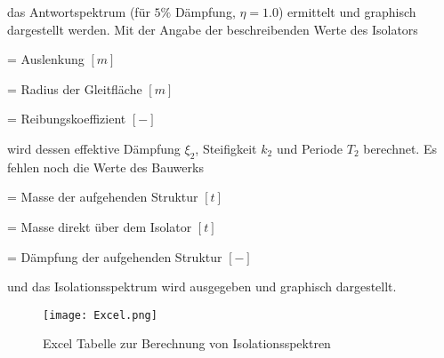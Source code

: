 \pagebreak

das Antwortspektrum (für $5\%$ Dämpfung, $\eta = 1.0$) ermittelt und graphisch dargestellt werden.
Mit der Angabe der beschreibenden Werte des Isolators

    = Auslenkung $[m]$ \par
{}    = Radius der Gleitfläche $[m]$ \par
\makebox[1cm]{$\mu$}  = Reibungskoeffizient $[-]$ \par

wird dessen effektive Dämpfung $\xi_2$, Steifigkeit $k_2$ und Periode $T_2$ berechnet. Es fehlen noch die Werte des Bauwerks

  = Masse der aufgehenden Struktur $[t]$ \par
{}  = Masse direkt über dem Isolator $[t]$ \par
{} = Dämpfung der aufgehenden Struktur $[-]$ \par

und das Isolationsspektrum wird ausgegeben und graphisch dargestellt.

\begin{figure}[H]
    \centering
    \texttt{[image: Excel.png]}
    \caption{Excel Tabelle zur Berechnung von Isolationsspektren}
    \label{fig:excel}
\end{figure}


\pagebreak